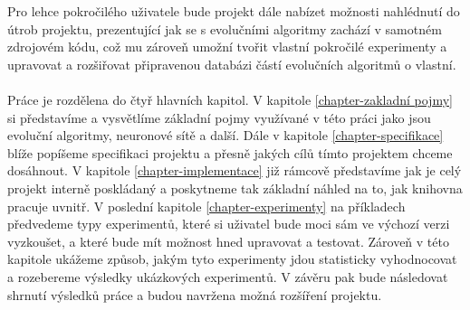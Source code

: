 Pro lehce pokročilého uživatele bude projekt dále nabízet možnosti nahlédnutí
do útrob projektu, prezentující jak se s evolučními algoritmy zachází v
samotném zdrojovém kódu, což mu zároveň umožní tvořit vlastní pokročilé
experimenty a upravovat a rozšiřovat připravenou databázi částí evolučních
algoritmů o vlastní.

\paragraph{}
Práce je rozdělena do čtyř hlavních kapitol. V kapitole
\ref{chapter-zakladní pojmy} si představíme a vysvětlíme základní pojmy
využívané v této práci jako jsou evoluční algoritmy, neuronové sítě a další.
Dále v kapitole \ref{chapter-specifikace} blíže popíšeme specifikaci projektu a
přesně jakých cílů tímto projektem chceme dosáhnout. V kapitole
\ref{chapter-implementace} již rámcově představíme jak je celý projekt interně
poskládaný a poskytneme tak základní náhled na to, jak knihovna pracuje uvnitř.
V poslední kapitole \ref{chapter-experimenty} na příkladech předvedeme
typy experimentů, které si uživatel bude moci sám ve výchozí verzi vyzkoušet, a
které bude mít možnost hned upravovat a testovat. Zároveň v této kapitole
ukážeme způsob, jakým tyto experimenty jdou statisticky vyhodnocovat a
rozebereme výsledky ukázkových experimentů. V závěru pak bude následovat
shrnutí výsledků práce a budou navržena možná rozšíření projektu.
